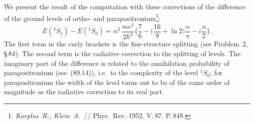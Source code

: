 We present the result of the computation with these corrections of the difference of the ground levels of ortho- and parapositronium\footnote{\textit{Karplus~R., Klein~A.}~// Phys.\ Rev. 1952. V.\,87. P.\,848.}:
\begin{equation}
E({}^3S_1) - E({}^1S_0) = \alpha^2\,\frac{me^4}{2\hbar^2}\biggl\{\frac{7}{6} - \biggl(\frac{16}{9} + \ln 2\biggr)\frac{\alpha}{\pi} - i\frac{\alpha}{2}\biggr\}.
\label{eq:125.19}
\end{equation}
The first term in the curly brackets is the fine-structure splitting (see Problem~2, \S\,84). The second term is the radiative correction to the splitting of levels. The imaginary part of the difference is related to the annihilation probability of parapositronium (see~(89.14)), i.e.\ to the complexity of the level ${}^1S_0$; for parapositronium the width of the level turns out to be of the same order of magnitude as the radiative correction to its real part.
